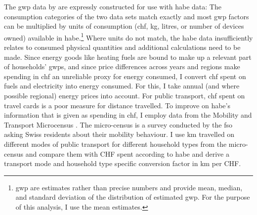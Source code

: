 \documentclass[referee, lineno, pdflatex,sn-apa]{sn-jnl}%
\theoremstyle{thmstyleone}%
\theoremstyle{thmstyletwo}%
\theoremstyle{thmstylethree}%
\begin{document}
The \ac{gwp} data by \citet{jakobs_nfp73_2023} are expressly constructed for use with \ac{habe} data:
The consumption categories of the two data sets match exactly and most \ac{gwp} factors can be multiplied by units of consumption (\ac{chf}, kg, litres, or number of devices owned) available in \ac{habe}.\footnote{%
  \ac{gwp} are estimates rather than precise numbers and \citet{jakobs_nfp73_2023} provide mean, median, and standard deviation of the distribution of estimated \ac{gwp}.
  For the purpose of this analysis, I use the mean estimates.
}
Where units do not match, the \ac{habe} data insufficiently relates to consumed physical quantities and additional calculations need to be made.
Since energy goods like heating fuels are bound to make up a relevant part of households' \acp{gwp}, and since price differences across years and regions make spending in \ac{chf} an unreliable proxy for energy consumed, I convert \ac{chf} spent on fuels and electricity into energy consumed.  %
For this, I take annual (and where possible regional) energy prices into account.
For public transport, \ac{chf} spent on travel cards is a poor measure for distance travelled.
To improve on \ac{habe}'s information that is given as spending in \ac{chf}, I employ data from the Mobility and Transport Microcensus \citep{biedermann_verkehrsverhalten_2017}.
The micro-census is a survey conducted by the \ac{fso} asking Swiss residents about their mobility behaviour.
I use km travelled on different modes of public transport for different household types from the micro-census and compare them with CHF spent according to \ac{habe} and derive a transport mode and household type specific conversion factor in km per CHF.
\end{document}
